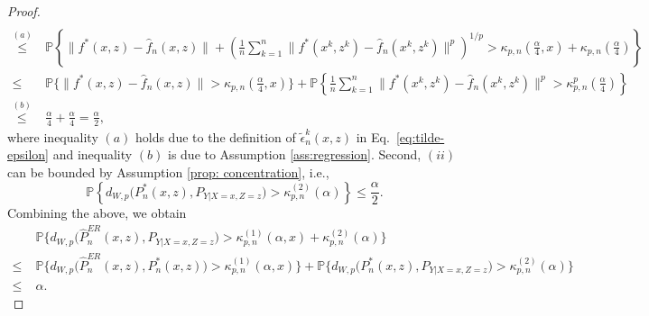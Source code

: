 \documentclass[10pt,a4paper]{amsart}
\begin{document}
\begin{proof}
\begin{align*}
    \\
        \overset{(a)}{\le} & \ \mathbb{P}\left\{\big\|f^*(x,z)-\hat{f}_n(x,z)\big\| +  \left(\frac{1}{n}\sum_{k=1}^n \big\|f^*(x^k,z^k) - \hat{f}_n(x^k,z^k)\big\|^p\right)^{1/p} > \kappa_{p,n} (\frac{\alpha}{4},x) + \kappa_{p,n} (\frac{\alpha}{4})\right\} 
    \\
         \leq &\  \mathbb{P}\Bigg\{\big\|f^*(x,z)-\hat{f}_n(x,z)\big\| > \kappa_{p,n}(\frac{\alpha}{4},x)\Bigg\} + \mathbb{P}\left\{\frac{1}{n} \sum_{k=1}^n \big\|f^*(x^k,z^k) - \hat{f}_n(x^k,z^k)\big\|^p > \kappa_{p,n}^p(\frac{\alpha}{4})\right\} 
    \\
         \overset{(b)}{\leq} &\ \frac{\alpha}{4} + \frac{\alpha}{4} = \frac{\alpha}{2},
    \end{align*}
\normalsize
where inequality $(a)$ holds due to the definition of $\tilde{\epsilon}_n^k(x,z)$ in Eq.\ \eqref{eq:tilde-epsilon} and inequality $(b)$ is due to Assumption \ref{ass:regression}.
Second, $(ii)$ can be bounded by Assumption \ref{prop: concentration}, i.e.,
\begin{equation*}
\mathbb P \left\{
d_{W,p}\bigl(P_n^*(x,z),P_{Y|X=x,Z=z}\bigr)
>
\kappa_{p,n}^{(2)}(\alpha)
\right\}
\le \frac{\alpha}{2}.
\end{equation*}
Combining the above, we obtain
\footnotesize
\begin{align*}
    & \mathbb P \biggl\{
d_{W,p}\bigl(\hat P_n^{ER}(x,z),P_{Y|X=x,Z=z}\bigr)
>
\kappa_{p,n}^{(1)}(\alpha,x)+\kappa_{p,n}^{(2)}(\alpha)
\biggr\} 
\\
\le\;&
\mathbb P\biggl\{
d_{W,p}\bigl(\hat P_n^{ER}(x,z),P_n^*(x,z)\bigr)
>
\kappa_{p,n}^{(1)}(\alpha,x)
\biggr\}
+
\mathbb P\biggl\{
d_{W,p}\bigl(P_n^*(x,z),P_{Y|X=x,Z=z}\bigr)
>
\kappa_{p,n}^{(2)}(\alpha)
\biggr\}
\\
\le\;& \alpha.
\end{align*}
\normalsize
\end{proof}
\end{document}
